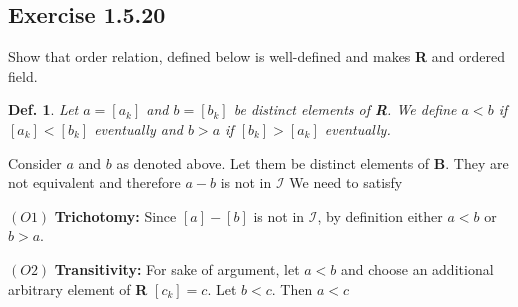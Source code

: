 \documentclass{tufte-book}
\theoremstyle{mytheoremstyle}
\theoremstyle{mylemstyle}
\theoremstyle{mydefstyle}
\newtheorem*{mydef}{Def.}
\begin{document}
\subsection{Exercise 1.5.20}
Show that order relation, defined below is well-defined and makes \textbf{R} and ordered field. 

\begin{mydef}Let $a = [a_k]$ and $b=[b_k]$ be distinct elements of \textbf{R}. We define $a<b$ if $[a_k] < [b_k]$ eventually and $b>a$ if $[b_k] > [a_k]$ eventually.
\end{mydef}

Consider $a$ and $b$ as denoted above.  Let them be distinct elements of \textbf{B}. They are not equivalent and therefore $a-b$ is not in $\mathcal{I}$  We need to satisfy

$(O1)$ \textbf{Trichotomy:}  Since $[a] - [b]$ is not in $\mathcal{I}$, by definition either $a < b$ or $b > a$.

$(O2)$ \textbf{Transitivity:} For sake of argument, let $a < b$ and choose an additional arbitrary element of \textbf{R} $[c_k] = c$. Let $b < c$. Then $a < c$
\end{document}
